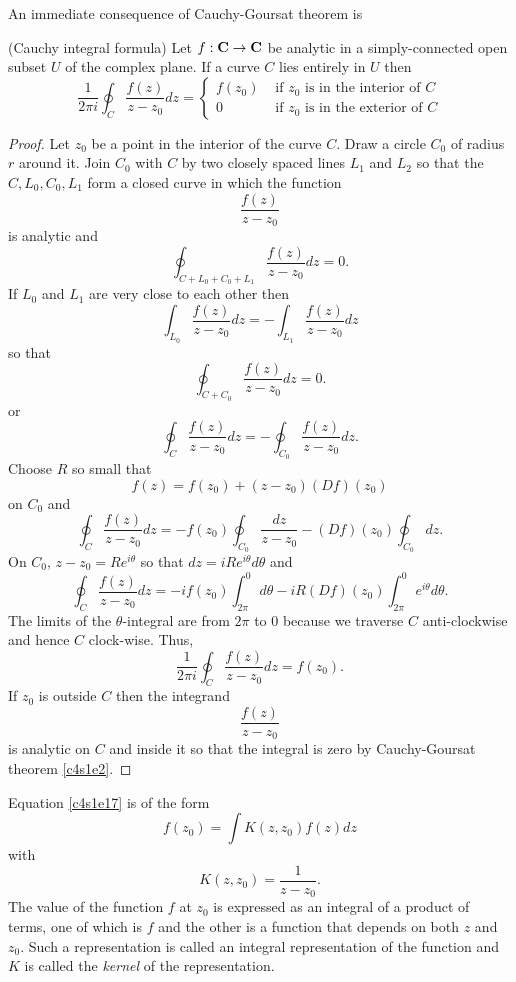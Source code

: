 An immediate consequence of Cauchy-Goursat theorem is
\begin{thm}(Cauchy integral formula)\label{c4s1t3}
Let $f:\mathbf{C} \rightarrow \mathbf{C}$ be analytic in a simply-connected open subset
$U$ of the complex plane. If a curve $C$ lies entirely in $U$ then
\begin{equation}\label{c4s1e17}
\frac{1}{2\pi i}\oint_C \frac{f(z)}{z - z_0}dz = \begin{cases}
f(z_0) & \text{ if $z_0$ is in the interior of $C$} \\
0      & \text{ if $z_0$ is in the exterior of $C$}
\end{cases}
\end{equation}
\end{thm}
\begin{proof}
Let $z_0$ be a point in the interior of the curve $C$. Draw a circle $C_0$ of 
radius $r$ around it. Join $C_0$ with $C$ by two closely spaced lines $L_1$ and
$L_2$ so that the $C, L_0, C_0, L_1$ form a closed curve in which the function
\[
\frac{f(z)}{z - z_0}
\]
is analytic and
\[
\oint_{C + L_0 + C_0 + L_1}\frac{f(z)}{z - z_0}dz = 0.
\]
If $L_0$ and $L_1$ are very close to each other then
\[
\int_{L_0} \frac{f(z)}{z - z_0}dz = 
-\int_{L_1} \frac{f(z)}{z - z_0}dz
\]
so that
\[
\oint_{C + C_0}\frac{f(z)}{z - z_0}dz = 0.
\]
or
\[
\oint_C \frac{f(z)}{z - z_0}dz = -\oint_{C_0}\frac{f(z)}{z - z_0}dz.
\]
Choose $R$ so small that
\[
f(z) = f(z_0) + (z - z_0)(Df)(z_0)
\]
on $C_0$ and
\[
\oint_C \frac{f(z)}{z - z_0}dz = -f(z_0)\oint_{C_0}\frac{dz}{z - z_0} -
 (Df)(z_0)\oint_{C_0}dz.
\]
On $C_0$, $z - z_0 = Re^{i\theta}$ so that $dz = iRe^{i\theta}d\theta$ and
\[
\oint_C \frac{f(z)}{z - z_0}dz = -if(z_0)\int_{2\pi}^0 d\theta - iR(Df)(z_0)
\int_{2\pi}^0 e^{i\theta}d\theta.
\]
The limits of the $\theta$-integral are from $2\pi$ to $0$ because we traverse
$C$ anti-clockwise and hence $C$ clock-wise. Thus,
\[
\frac{1}{2\pi i}\oint_C \frac{f(z)}{z - z_0}dz = f(z_0).
\]
If $z_0$ is outside $C$ then the integrand
\[
\frac{f(z)}{z - z_0}
\]
is analytic on $C$ and inside it so that the integral is zero by Cauchy-Goursat
theorem \ref{c4s1e2}.
\end{proof}

Equation \eqref{c4s1e17} is of the form
\begin{equation}\label{c4s1e18}
f(z_0) = \int K(z, z_0)f(z)dz
\end{equation}
with
\[
K(z, z_0) = \frac{1}{z - z_0}.
\]
The value of the function $f$ at $z_0$ is expressed as an integral of a product
of terms, one of which is $f$ and the other is a function that depends on both
$z$ and $z_0$. Such a representation is called an integral representation of 
the function and $K$ is called the \emph{kernel} of the representation.

